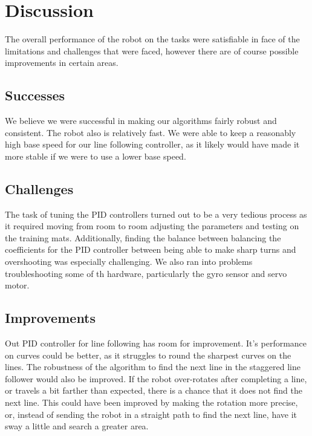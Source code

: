 \documentclass[12pt]{article}
\begin{document}
\section{Discussion}

The overall performance of the robot on the tasks were satisfiable in face of the limitations and challenges that were faced, however there are of course possible improvements in certain areas. 

\subsection{Successes}

We believe we were successful in making our algorithms fairly robust and consistent. The robot also is relatively fast. We were able to keep a reasonably high base speed for our line following controller, as it likely would have made it more stable if we were to use a lower base speed.

\subsection{Challenges}

The task of tuning the PID controllers turned out to be a very tedious process as it required moving from room to room adjusting the parameters and testing on the training mats. Additionally, finding the balance between balancing the coefficients for the PID controller between being able to make sharp turns and overshooting was especially challenging. We also ran into problems troubleshooting some of th hardware, particularly the gyro sensor and servo motor.

\subsection{Improvements}

Out PID controller for line following has room for improvement. It's performance on curves could be better, as it struggles to round the sharpest curves on the lines. The robustness of the algorithm to find the next line in the staggered line follower would also be improved. If the robot over-rotates after completing a line, or travels a bit farther than expected, there is a chance that it does not find the next line. This could have been improved by making the rotation more precise, or, instead of sending the robot in a straight path to find the next line, have it sway a little and search a greater area.
\end{document}
